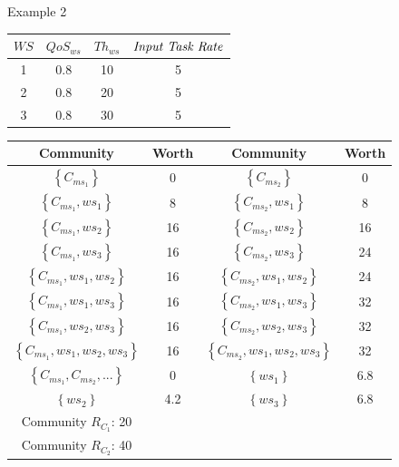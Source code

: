 \documentclass{beamer}
\begin{document}
\begin{frame}{Example 2}
    \begin{table}[!t]
    \renewcommand{\arraystretch}{0.8}
    \label{example_3}
    \centering
    \begin{tabular}{c c c c}
    \hline
    $WS$ & $QoS_{ws}$ & $Th_{ws}$ & $\text{\emph{Input Task Rate}}$\\
    \hline
    1 & 0.8 & 10 & 5\\
    2 & 0.8 & 20 & 5\\
    3 & 0.8 & 30 & 5\\
    \hline
    \end{tabular}
    \end{table}

    \begin{table}[!t]
    \renewcommand{\arraystretch}{0.8}
    \label{example_3_2}
    \centering
    \begin{tabular}{c c || c c}
    \hline
    Community & Worth & Community & Worth\\
    \hline
    $\left\{C_{ms_1}\right\}$ & 0 & $\left\{C_{ms_2}\right\}$ & 0\\
    $\left\{C_{ms_1}, ws_1\right\}$ & 8 & $\left\{C_{ms_2}, ws_1\right\}$ & 8\\
    $\left\{C_{ms_1}, ws_2\right\}$ & 16 & $\left\{C_{ms_2}, ws_2\right\}$ & 16\\
    $\left\{C_{ms_1}, ws_3\right\}$ & 16 & $\left\{C_{ms_2}, ws_3\right\}$ & 24\\
    $\left\{C_{ms_1}, ws_1, ws_2\right\}$ & 16 & $\left\{C_{ms_2}, ws_1, ws_2\right\}$ & 24\\
    $\left\{C_{ms_1}, ws_1, ws_3\right\}$ & 16 & $\left\{C_{ms_2}, ws_1, ws_3\right\}$ & 32\\
    $\left\{C_{ms_1}, ws_2, ws_3\right\}$ & 16 & $\left\{C_{ms_2}, ws_2, ws_3\right\}$ & 32\\
    $\left\{C_{ms_1}, ws_1, ws_2, ws_3\right\}$ & 16 & $\left\{C_{ms_2}, ws_1, ws_2, ws_3\right\}$ & 32\\
    $\left\{C_{ms_1}, C_{ms_2}, ...\right\}$ & 0 & $\left\{ws_1\right\}$ & 6.8\\
    $\left\{ws_2\right\}$ & 4.2 & $\left\{ws_3\right\}$ & 6.8\\
    \hline
    Community $R_{C_1}$: 20 \\ Community $R_{C_2}$: 40\\
    \hline
    \end{tabular}
    \end{table}
\end{frame}
\end{document}
